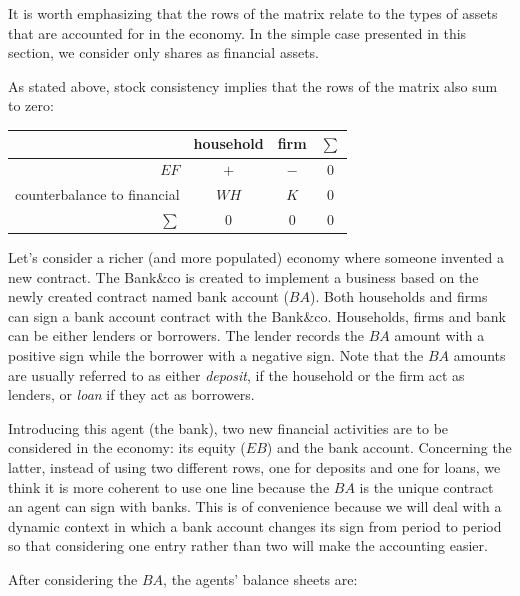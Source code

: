 \documentclass{article}
\begin{document}
It is worth emphasizing that the rows of the matrix relate to the types of assets that are accounted for in the economy.  In the simple case presented in this section, we consider only shares as financial assets.

\vskip5mm

As stated above, stock consistency implies that the rows of the matrix also sum to zero:

\vskip5mm
\begin{center}
\begin{tabular}{r c c c}
	\hline
	& household 	& \parbox{1.5cm}{\centerline{firm}}  &$\sum$\\
\hline
\hline
$EF$	&	$+$	&$-$	&0\\
	\hline
counterbalance to financial	&	$WH$	&$K$	&0\\
	\hline
	\hline
$\sum$ &	0	&0	&0
\end{tabular}

\end{center}
\vskip5mm

Let's consider a richer (and more populated) economy where someone invented a new contract. 
The Bank\&co is created to implement a business based on the newly created contract named bank account ($BA$). Both households and firms can sign a bank account contract with the Bank\&co.
 Households, firms and bank can be either lenders or borrowers. The lender records the $BA$ amount with a positive sign while the borrower with a negative sign. Note that the $BA$ amounts are usually referred to as either \textit{deposit}, if the household or the firm act as lenders, or \textit{loan} if they act as borrowers.  

Introducing this agent (the bank), two new financial activities are to be considered in the economy: its equity ($EB$) and the bank account. 
Concerning the latter, instead of using two different rows, one for deposits and one for loans, we think it is more coherent to use one line because the $BA$ is the unique contract an agent can sign with banks. This is of convenience because we will deal with a dynamic context in which a bank account changes its sign from period to period so that considering one entry rather than two will make the accounting easier.   

After considering the $BA$, the agents' balance sheets are:
\end{document}
